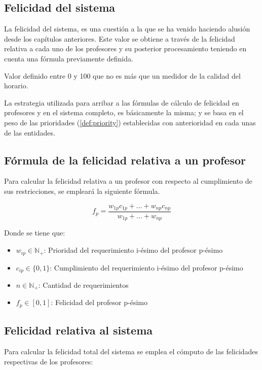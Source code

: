 \subsection{Felicidad del sistema}

La felicidad del sistema, es una cuestión a la que se ha venido haciendo alusión desde los capítulos anteriores. Este valor se obtiene a través de la felicidad relativa a cada uno de los profesores y su posterior procesamiento teniendo en cuenta una fórmula previamente definida.

\begin{dfn} 
	Valor definido entre 0 y 100 que no es más que un medidor de la calidad del horario.
\end{dfn}

La estrategia utilizada para arribar a las fórmulas de cálculo de felicidad en profesores y en el sistema completo, es básicamente la misma; y se basa en el peso de las prioridades (\ref{def:priority}) establecidas con anterioridad en cada unas de las entidades.

\subsection{Fórmula de la felicidad relativa a un profesor}
Para calcular la felicidad relativa a un profesor con respecto al cumplimiento de sus restricciones, se empleará la siguiente fórmula.

\begin{equation}
	f_p = \frac{w_{1p}c_{1p} + \dots + w_{np}c_{np} }{w_{1p} + \dots + w_{np}}
\end{equation}

\noindent Donde se tiene que: \\

\begin{itemize}
 	\item $w_{ip} \in \mathbb{N}_+ $: Prioridad del requerimiento i-ésimo del profesor p-ésimo
	\item $c_{ip} \in \{0, 1\}$: Cumplimiento del requerimiento i-ésimo del profesor p-ésimo
	\item $n \in \mathbb{N}_+$: Cantidad de requerimientos
	\item $f_p \in [0, 1]$: Felicidad del profesor p-ésimo
\end{itemize}

\subsection{Felicidad relativa al sistema}
Para calcular la felicidad total del sistema se emplea el cómputo de las felicidades respectivas de los profesores:

